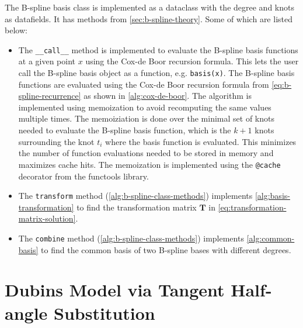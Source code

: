 The B-spline basis class is implemented as a dataclass with the degree and knots as datafields. It has methods from \cref{sec:b-spline-theory}. Some of which are listed below:
\begin{itemize}
    \item 
    The \texttt{\_\_call\_\_} method is implemented to evaluate the B-spline basis functions at a given point $x$ using the Cox-de Boor recursion formula. This lets the user call the B-spline basis object as a function, e.g. \texttt{basis(x)}. The B-spline basis functions are evaluated using the Cox-de Boor recursion formula from \cref{eq:b-spline-recurrence} as shown in \cref{alg:cox-de-boor}. The algorithm is implemented using memoization to avoid recomputing the same values multiple times. The memoiziation is done over the minimal set of knots needed to evaluate the B-spline basis function, which is the $k+1$ knots surrounding the knot $t_i$ where the basis function is evaluated. This minimizes the number of function evaluations needed to be stored in memory and maximizes cache hits. The memoization is implemented using the \texttt{@cache} decorator from the functools library.
    \item
    The \texttt{transform} method (\cref{alg:b-spline-class-methods}) implements \cref{alg:basis-transformation} to find the transformation matrix $\mathbf T$ in \cref{eq:transformation-matrix-solution}.
    \item
    The \texttt{combine} method (\cref{alg:b-spline-class-methods}) implements \cref{alg:common-basis} to find the common basis of two B-spline bases with different degrees. 
\end{itemize}





\chapter{Dubins Model via Tangent Half-angle Substitution}\label{app:tangent-half-angle}

